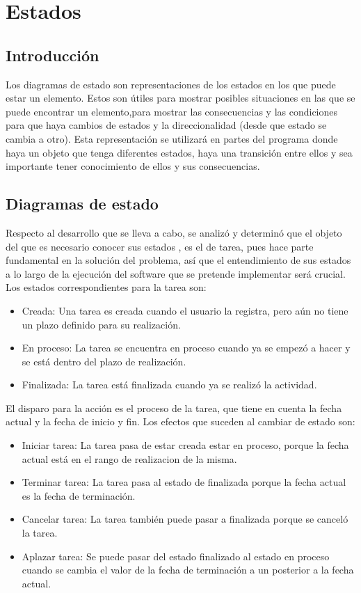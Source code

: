 \chapter{Estados}
\section{Introducción}
Los diagramas de estado son representaciones de los estados en los que puede estar un elemento. Estos son útiles para mostrar posibles situaciones en las que se puede encontrar un elemento,para mostrar las consecuencias y las condiciones para que haya cambios de estados y la direccionalidad (desde que estado se cambia a otro). Esta representación se utilizará en partes del programa donde haya un objeto que tenga diferentes estados, haya una transición entre ellos y sea importante tener conocimiento de ellos y sus consecuencias.

\section{Diagramas de estado}
Respecto al desarrollo que se lleva a cabo, se analizó y determinó que el objeto del que es necesario conocer sus estados , es el de tarea, pues hace parte fundamental en la solución del problema, así que el entendimiento de sus estados a lo largo de la ejecución del software que se pretende implementar será crucial.
\\
Los estados correspondientes para la tarea son:
\begin{itemize}
	\item Creada: Una tarea es  creada cuando el usuario la registra, pero aún no tiene un plazo definido para su realización.
	\item En proceso: La tarea se encuentra en proceso cuando ya se empezó a hacer y se está dentro del plazo de realización.
	\item Finalizada: La tarea está finalizada cuando ya se realizó la actividad.
\end{itemize}
El disparo para la acción es el proceso de la  tarea, que tiene en cuenta la fecha actual y la fecha de inicio y fin. Los efectos que suceden al cambiar de estado son:
\begin{itemize}
\item Iniciar tarea: La tarea pasa de estar creada estar en proceso, porque la fecha actual está en el rango de realizacion de la misma.
\item Terminar tarea: La tarea pasa al estado de finalizada porque la fecha actual es la fecha de terminación.
\item Cancelar tarea: La tarea también puede pasar a finalizada porque se canceló la tarea.
\item Aplazar tarea: Se puede pasar del estado finalizado al estado en proceso cuando se cambia el valor de la fecha de terminación a un posterior a la fecha actual.
\end{itemize}


